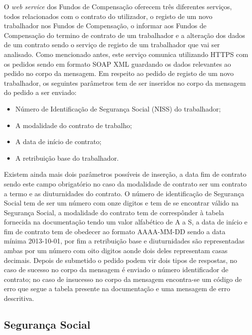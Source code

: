 \documentclass[sigplan]{acmart}
\begin{document}
O \textit{web service} dos Fundos de Compensação oferecem três diferentes serviços, todos relacionados com o contrato do utilizador, o registo de um novo trabalhador nos Fundos de Compensação, o informar aos Fundos de Compensação do termino de contrato de um trabalhador e a alteração dos dados de um contrato sendo o serviço de registo de um trabalhador que vai ser analisado. Como mencionado antes, este serviço comunica utilizando HTTPS com os pedidos sendo em formato SOAP XML guardando os dados relevantes ao pedido no corpo da mensagem. Em respeito ao pedido de registo de um novo trabalhador, os seguintes parâmetros tem de ser inseridos no corpo da mensagem do pedido a ser enviado:
\begin{itemize}
  \item Número de Identificação de Segurança Social (NISS) do trabalhador;
  \item A modalidade do contrato de trabalho;
  \item A data de início de contrato;
  \item A retribuição base do trabalhador.
\end{itemize}
Existem ainda mais dois parâmetros possíveis de inserção, a data fim de contrato sendo este campo obrigatório no caso da modalidade de contrato ser um contrato a termo e as diuturnidades do contrato. O número de identificação de Segurança Social tem de ser um número com onze digitos e tem de se encontrar válido na Segurança Social, a modalidade do contrato tem de correspônder à tabela fornecida na documentação tendo um valor alfabético de A a S, a data de início e fim de contrato tem de obedecer ao formato AAAA-MM-DD sendo a data mínima 2013-10-01, por fim a retribuição base e diuturnidades são representadas ambas por um número com oito digitos aonde dois deles representam casas decimais. Depois de submetido o pedido podem vir dois tipos de respostas, no caso de sucesso no corpo da mensagem é enviado o número identificador de contrato; no caso de insucesso no corpo da mensagem encontra-se um código de erro que segue a tabela presente na documentação e uma mensagem de erro descritiva.

\subsection{Segurança Social}
\end{document}

